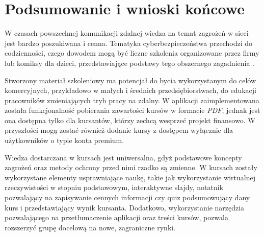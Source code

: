 \documentclass[12pt,twoside]{article}
\begin{document}
\section{Podsumowanie i wnioski końcowe}

W czasach powszechnej komunikacji zdalnej wiedza na temat zagrożeń w sieci jest bardzo poszukiwana i cenna. Tematyka cyberbezpieczeństwa przechodzi do codzienności, czego dowodem mogą być liczne szkolenia organizowane przez firmy lub komiksy dla dzieci, przedstawiające podstawy tego obszernego zagadnienia \cite{Edukomiks}.


Stworzony materiał szkoleniowy ma potencjał do bycia wykorzystanym do celów komercyjnych, przykładowo w małych i średnich przedsiębiorstwach, do edukacji pracowników zmieniających tryb pracy na zdalny. W aplikacji zaimplementowana została funkcjonalność pobierania zawartości kursów w formacie \emph{PDF}, jednak jest ona dostępna tylko dla kursantów, którzy zechcą wesprzeć projekt finansowo. W przyszłości mogą zostać również dodanie kursy z dostępem wyłącznie dla użytkowników o typie konta premium. 

Wiedza dostarczana w kursach jest uniwersalna, gdyż podstawowe koncepty zagrożeń oraz metody ochrony przed nimi rzadko są zmienne. W kursach zostały wykorzystane elementy usprawniające naukę, takie jak wykorzystanie wirtualnej rzeczywistości w stopniu podstawowym, interaktywne slajdy, notatnik pozwalający na zapisywanie cennych informacji czy quiz podsumowujący dany kurs i przedstawiający wynik kursanta. Dodatkowo, wykorzystanie narzędzia pozwalającego na przetłumaczenie aplikacji oraz treści kursów, pozwala rozszerzyć grupę docelową na nowe, zagraniczne rynki.
\end{document}

